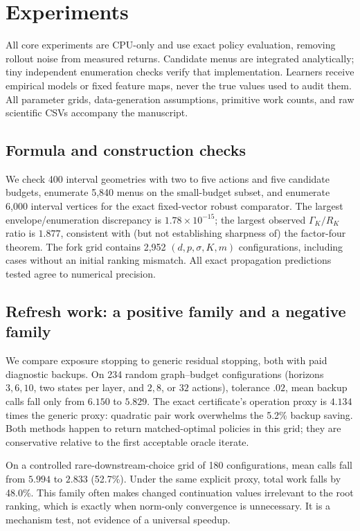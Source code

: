 \documentclass[11pt]{article}
\begin{document}
\section{Experiments}
\label{sec:experiments}
All core experiments are CPU-only and use exact policy evaluation, removing rollout noise from measured returns. Candidate menus are integrated analytically; tiny independent enumeration checks verify that implementation. Learners receive empirical models or fixed feature maps, never the true values used to audit them. All parameter grids, data-generation assumptions, primitive work counts, and raw scientific CSVs accompany the manuscript.

\subsection{Formula and construction checks}
We check 400 interval geometries with two to five actions and five candidate budgets, enumerate 5,840 menus on the small-budget subset, and enumerate 6,000 interval vertices for the exact fixed-vector robust comparator. The largest envelope/enumeration discrepancy is $1.78\times10^{-15}$; the largest observed $\Gamma_K/R_K$ ratio is $1.877$, consistent with (but not establishing sharpness of) the factor-four theorem. The fork grid contains 2,952 $(d,p,\sigma,K,m)$ configurations, including cases without an initial ranking mismatch. All exact propagation predictions tested agree to numerical precision.

\subsection{Refresh work: a positive family and a negative family}
We compare exposure stopping to generic residual stopping, both with paid diagnostic backups. On 234 random graph--budget configurations (horizons $3,6,10$, two states per layer, and $2,8$, or $32$ actions), tolerance $.02$, mean backup calls fall only from $6.150$ to $5.829$. The exact certificate's operation proxy is $4.134$ times the generic proxy: quadratic pair work overwhelms the 5.2\% backup saving. Both methods happen to return matched-optimal policies in this grid; they are conservative relative to the first acceptable oracle iterate.

On a controlled rare-downstream-choice grid of 180 configurations, mean calls fall from $5.994$ to $2.833$ (52.7\%). Under the same explicit proxy, total work falls by 48.0\%. This family often makes changed continuation values irrelevant to the root ranking, which is exactly when norm-only convergence is unnecessary. It is a mechanism test, not evidence of a universal speedup.
\end{document}
